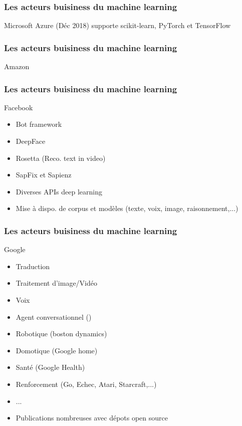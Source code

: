 \documentclass{formation}
\begin{document}
\begin{frame}
  \frametitle{Les acteurs buisiness du machine learning}
  Microsoft Azure
  \newline
  (Déc 2018) supporte scikit-learn, PyTorch et TensorFlow
\end{frame}

\begin{frame}
  \frametitle{Les acteurs buisiness du machine learning}
  Amazon
\end{frame}

\begin{frame}
  \frametitle{Les acteurs buisiness du machine learning}
  Facebook
  \begin{itemize}
  \item Bot framework
  \item DeepFace
  \item Rosetta (Reco. text in video)
  \item SapFix et Sapienz 
  \item Diverses APIs deep learning
  \item Mise à dispo. de corpus et modèles (texte, voix, image, raisonnement,...)
  \end{itemize}
\end{frame}

\begin{frame}
  \frametitle{Les acteurs buisiness du machine learning}
  Google
  \begin{itemize}
  \item Traduction
  \item Traitement d'image/Vidéo
  \item Voix
  \item Agent conversationnel (\href{https://www.youtube.com/watch?v=d40jgFZ5hXk}{})
  \item Robotique (boston dynamics)
  \item Domotique (Google home)
  \item Santé (Google Health)
  \item Renforcement (Go, Echec, Atari, Starcraft,...)
  \item ...
  \item Publications nombreuses avec dépots open source
  \end{itemize}
\end{frame}
\end{document}
